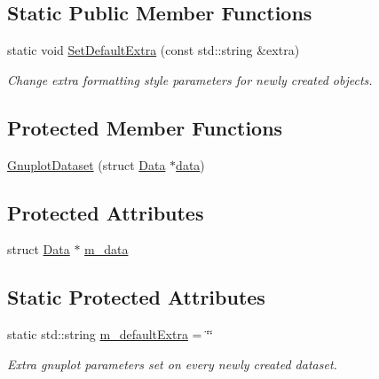 \subsection*{Static Public Member Functions}
\begin{DoxyCompactItemize}
\item 
static void \hyperlink{classns3_1_1GnuplotDataset_a49e8bfcba6d5395d04dce67859fa0c69}{Set\+Default\+Extra} (const std\+::string \&extra)
\begin{DoxyCompactList}\small\item\em Change extra formatting style parameters for newly created objects. \end{DoxyCompactList}\end{DoxyCompactItemize}
\subsection*{Protected Member Functions}
\begin{DoxyCompactItemize}
\item 
\hyperlink{classns3_1_1GnuplotDataset_a468eb51149d78a8b66ac2f6de88d3dbc}{Gnuplot\+Dataset} (struct \hyperlink{structns3_1_1GnuplotDataset_1_1Data}{Data} $\ast$\hyperlink{topology-example-sim_8cc_a26c65296e316af77b787dc77469bb2a4}{data})
\end{DoxyCompactItemize}
\subsection*{Protected Attributes}
\begin{DoxyCompactItemize}
\item 
struct \hyperlink{structns3_1_1GnuplotDataset_1_1Data}{Data} $\ast$ \hyperlink{classns3_1_1GnuplotDataset_a5ac51c2f9860283061e00cb046c56317}{m\+\_\+data}
\end{DoxyCompactItemize}
\subsection*{Static Protected Attributes}
\begin{DoxyCompactItemize}
\item 
static std\+::string \hyperlink{classns3_1_1GnuplotDataset_a6b75e4f59f53c4d58a7679759a830e3e}{m\+\_\+default\+Extra} = \char`\"{}\char`\"{}
\begin{DoxyCompactList}\small\item\em Extra gnuplot parameters set on every newly created dataset. \end{DoxyCompactList}\end{DoxyCompactItemize}
